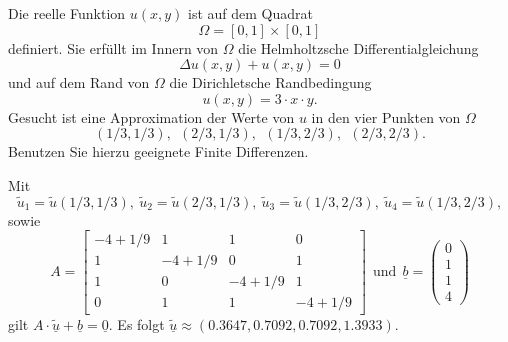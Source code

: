 Die reelle Funktion $u(x,y)$ ist auf dem Quadrat
\[
\Omega = [0, 1] \times [0,1]
\]
definiert.
Sie erfüllt im Innern von $\Omega$ die Helmholtzsche Differentialgleichung
\[
\Delta u(x,y) + u(x,y) = 0
\]
und auf dem Rand von $\Omega$ die Dirichletsche Randbedingung
\[
u(x,y) = 3 \cdot x \cdot y.
\]
Gesucht ist eine Approximation der Werte von $u$ in den vier Punkten
von $\Omega$
\[
(1/3,1/3), \ \  (2/3,1/3), \ \ (1/3,2/3), \ \ (2/3, 2/3).
\]
Benutzen Sie hierzu geeignete Finite Differenzen.

\begin{loesung}
Mit 
\[
\tilde u_1 = \tilde u(1/3,1/3), \ \tilde u_2 = \tilde u(2/3,1/3), \ \tilde u_3 = \tilde u(1/3,2/3), \ \tilde u_4 = \tilde u(1/3,2/3),
\]
sowie
\[
A = \left[\begin{array}{cccc} 
-4 + 1/9 & 1  & 1 & 0 \\
 1 & -4 + 1/9 & 0 & 1 \\
 1 & 0 & -4 + 1/9 & 1 \\ 
 0 & 1 & 1  & -4 + 1/9 \end{array}\right]
\ \ \text{und} \ \
\underline{b} =  \left(\begin{array}{r} 0 \\ 1 \\ 1 \\ 4 \end{array}\right)
\]
gilt
$A \cdot \underline{\tilde u} + \underline{b} = \underline{0}.$
Es folgt
$\underline{\tilde u} \approx (0.3647, 0.7092, 0.7092, 1.3933).$
\end{loesung}

